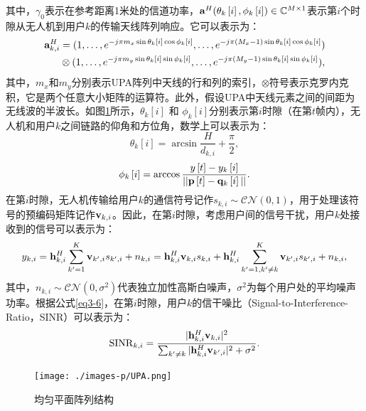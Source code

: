 \documentclass{article}
\begin{document}
    \noindent 其中，$\gamma_0$表示在参考距离1米处的信道功率，$\bold a^{H}(\theta_k\left[i\right],\phi_k\left[i\right]) \in \mathbb{C}^{M\times 1}$表示第$i$个时隙从无人机到用户$k$的传输天线阵列响应。它可以表示为：
    \begin{equation}\label{eq3-3}
      \begin{split}
        \bold a^{H}_{k,i}&=(1,\dots,e^{-j\pi m_x\sin{\theta_k\left[i\right]}\cos{\phi_k\left[i\right]}},\dots,e^{-j\pi(M_x-1)\sin{\theta_k\left[i\right]}\cos{\phi_k\left[i\right]}})\\ 
        &\otimes(1,\dots,e^{-j\pi m_y\sin{\theta_k\left[i\right]}\sin{\phi_k\left[i\right]}},\dots,e^{-j\pi(M_y-1)\sin{\theta_k\left[i\right]}\sin{\phi_k\left[i\right]}}),
      \end{split}
    \end{equation}
    其中，$m_x$和$m_y$分别表示UPA阵列中天线的行和列的索引，$\otimes$符号表示克罗内克积，它是两个任意大小矩阵的运算符。此外，假设UPA中天线元素之间的间距为无线波的半波长。如图\ref{Fig3-3}所示，$\theta_k\left[i\right]$ 和 $\phi_k\left[i\right]$分别表示第$i$时隙（在第$t$帧内），无人机和用户$k$之间链路的仰角和方位角，数学上可以表示为：
    \begin{equation}\label{eq3-4}
      \theta_k\left[i\right]=\arcsin \frac{H}{d_{k,i}}+\frac{\pi}{2},
    \end{equation}
    \begin{equation}\label{eq3-5}
      \phi_k\left[i\right]=\arccos{\frac{y\left[t\right]-y_k\left[i\right]}{||\bold p\left[t\right]-\bold q_k\left[i\right]||}}.
    \end{equation}
    在第$i$时隙，无人机传输给用户$k$的通信符号记作$s_{k,i}\sim \mathcal C \mathcal N(0,1)$，用于处理该符号的预编码矩阵记作$\bold v_{k,i}$。因此，在第$i$时隙，考虑用户间的信号干扰，用户$k$处接收到的信号可以表示为：
    \begin{equation}\label{eq3-6}
        y_{k,i}=\bold h_{k,i}^H \sum_{k^{\prime}=1}^K \bold v_{k^{\prime},i}s_{k^{\prime},i}+n_{k,i}=\bold h_{k,i}^H\bold v_{k,i}s_{k,i}+\bold h_{k,i}^H\sum_{k^{\prime}=1,k^{\prime}\neq k}^K \bold v_{k^{\prime},i}s_{k^{\prime},i}+n_{k,i},
    \end{equation}
    其中，$n_{k,i}\sim \mathcal C \mathcal N(0,\sigma^{2})$代表独立加性高斯白噪声，$\sigma^{2}$为每个用户处的平均噪声功率。根据公式\eqref{eq3-6}，在第$i$时隙，用户$k$的信干噪比（Signal-to-Interference-Ratio，SINR）可以表示为：
    \begin{equation}\label{eq3-7}
      {\rm SINR}_{k,i}=\frac{|\bold h_{k,i}^H\bold v_{k,i}|^2}{\sum_{k^{\prime}\neq k}|\bold h_{k,i}^H\bold v_{k^{\prime},i}|^2+\sigma^2}.
    \end{equation}
    \begin{figure}[htbp]
      \centering
      \texttt{[image: ./images-p/UPA.png]}
      \caption{均匀平面阵列结构}
      \label{Fig3-3}
    \end{figure}\par 
\end{document}
